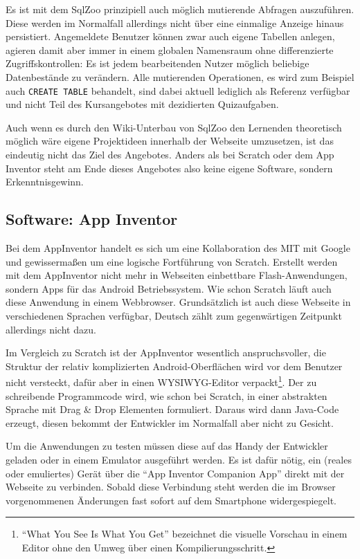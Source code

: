 Es ist mit dem SqlZoo prinzipiell auch möglich mutierende Abfragen auszuführen. Diese werden im Normalfall allerdings nicht über eine einmalige Anzeige hinaus persistiert. Angemeldete Benutzer können zwar auch eigene Tabellen anlegen, agieren damit aber immer in einem globalen Namensraum ohne differenzierte Zugriffskontrollen: Es ist jedem bearbeitenden Nutzer möglich beliebige Datenbestände zu verändern. Alle mutierenden Operationen, es wird zum Beispiel auch \lstinline{CREATE TABLE} behandelt, sind dabei aktuell lediglich als Referenz verfügbar und nicht Teil des Kursangebotes mit dezidierten Quizaufgaben.

Auch wenn es durch den Wiki-Unterbau von SqlZoo den Lernenden theoretisch möglich wäre eigene Projektideen innerhalb der Webseite umzusetzen, ist das eindeutig nicht das Ziel des Angebotes. Anders als bei Scratch oder dem App Inventor steht am Ende dieses Angebotes also keine eigene Software, sondern Erkenntnisgewinn.

\subsection{Software: App Inventor}

Bei dem AppInventor handelt es sich um eine Kollaboration des MIT mit Google und gewissermaßen um eine logische Fortführung von Scratch. Erstellt werden mit dem AppInventor nicht mehr in Webseiten einbettbare Flash-Anwendungen, sondern Apps für das Android Betriebssystem. Wie schon Scratch läuft auch diese Anwendung in einem Webbrowser. Grundsätzlich ist auch diese Webseite in verschiedenen Sprachen verfügbar, Deutsch zählt zum gegenwärtigen Zeitpunkt allerdings nicht dazu.

Im Vergleich zu Scratch ist der AppInventor wesentlich anspruchsvoller, die Struktur der relativ komplizierten Android-Oberflächen wird vor dem Benutzer nicht versteckt, dafür aber in einen WYSIWYG-Editor verpackt\footnote{"`What You See Is What You Get"' bezeichnet die visuelle Vorschau in einem Editor ohne den Umweg über einen Kompilierungsschritt.}. Der zu schreibende Programmcode wird, wie schon bei Scratch, in einer abstrakten Sprache mit Drag \& Drop Elementen formuliert. Daraus wird dann Java-Code erzeugt, diesen bekommt der Entwickler im Normalfall aber nicht zu Gesicht.

Um die Anwendungen zu testen müssen diese auf das Handy der Entwickler geladen oder in einem Emulator ausgeführt werden. Es ist dafür nötig, ein (reales oder emuliertes) Gerät über die "`App Inventor Companion App"' direkt mit der Webseite zu verbinden. Sobald diese Verbindung steht werden die im Browser vorgenommenen Änderungen fast sofort auf dem Smartphone widergespiegelt.

